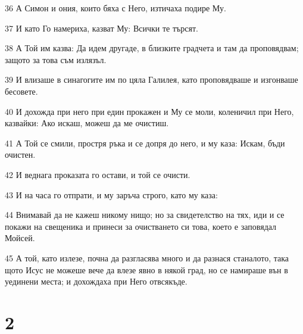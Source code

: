 \par 36 А Симон и ония, които бяха с Него, изтичаха подире Му.
\par 37 И като Го намериха, казват Му: Всички те търсят.
\par 38 А Той им казва: Да идем другаде, в близките градчета и там да проповядвам; защото за това съм излязъл.
\par 39 И влизаше в синагогите им по цяла Галилея, като проповядваше и изгонваше бесовете.
\par 40 И дохожда при него при един прокажен и Му се моли, коленичил при Него, казвайки: Ако искаш, можеш да ме очистиш.
\par 41 А Той се смили, простря ръка и се допря до него, и му каза: Искам, бъди очистен.
\par 42 И веднага проказата го остави, и той се очисти.
\par 43 И на часа го отпрати, и му заръча строго, като му каза:
\par 44 Внимавай да не кажеш никому нищо; но за свидетелство на тях, иди и се покажи на свещеника и принеси за очистването си това, което е заповядал Мойсей.
\par 45 А той, като излезе, почна да разгласява много и да разнася станалото, така щото Исус не можеше вече да влезе явно в някой град, но се намираше вън в уединени места; и дохождаха при Него отвсякъде.

\chapter{2}

